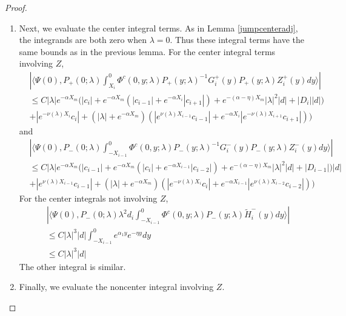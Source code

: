 \documentclass[thesis.tex]{subfiles}
\begin{document}
\begin{lemma}
\begin{proof}
\begin{enumerate}
\item Next, we evaluate the center integral terms. As in Lemma \ref{jumpcenteradj}, the integrands are both zero when $\lambda = 0$. Thus these integral terms have the same bounds as in the previous lemma. For the center integral terms involving $Z$,
\begin{align*}
&\left| \langle \Psi(0), P_+(0; \lambda) \int_{X_i}^0 \Phi^c(0, y; \lambda) P_+(y; \lambda)^{-1} G_i^+(y) P_+(y; \lambda) Z_i^+(y) dy \rangle \right| \\
&\leq C |\lambda| e^{-\alpha X_m}\Big(|c_i| + e^{-\alpha X_m}(|c_{i-1}| + e^{-\alpha X_i} |c_{i+1}|) + e^{-(\alpha - \eta) X_m}|\lambda|^2|d| + |D_i||d|) \\
&+ |e^{-\nu(\lambda)X_i} c_i| + (|\lambda| + e^{-\alpha X_m})(|e^{\nu(\lambda)X_{i-1}} c_{i-1}| + e^{-\alpha X_i} |e^{-\nu(\lambda)X_{i+1}} c_{i+1}|)\Big)
\end{align*}
and
\begin{align*}
&\left| \langle \Psi(0), P_-(0; \lambda) \int_{-X_{i-1}}^0 \Phi^c(0, y; \lambda) P_-(y; \lambda)^{-1} G_i^-(y) P_-(y; \lambda)Z_i^-(y) dy \rangle \right| \\
&\leq C |\lambda| e^{-\alpha X_m} \Big(|c_{i-1}| + e^{-\alpha X_m}(|c_i| + e^{-\alpha X_{i-1}} |c_{i-2}|) + e^{-(\alpha - \eta) X_m}|\lambda|^2|d| + |D_{i-1}|)|d| \\
&+ |e^{\nu(\lambda)X_{i-1}}c_{i-1}| + (|\lambda| + e^{-\alpha X_m})(|e^{-\nu(\lambda)X_i} c_i| + e^{-\alpha X_{i-1}} |e^{\nu(\lambda)X_{i-2}} c_{i-2}|)\Big)
\end{align*}
For the center integrals not involving $Z$, 
\begin{align*}
&\left| \langle \Psi(0), P_-(0; \lambda) \lambda^2 d_i \int_{-X_{i-1}}^0 \Phi^c(0, y; \lambda) P_-(y; \lambda) \tilde{H}_i^-(y) dy \rangle \right| \\
&\leq C |\lambda|^3 |d| \int_{-X_{i-1}}^0 e^{\alpha_1 y} e^{-\eta y} dy \\
&\leq C |\lambda|^3 |d| 
\end{align*}
The other integral is similar.

\item Finally, we evaluate the noncenter integral involving $Z$.


\end{enumerate}
\end{proof}
\end{lemma}
\end{document}
